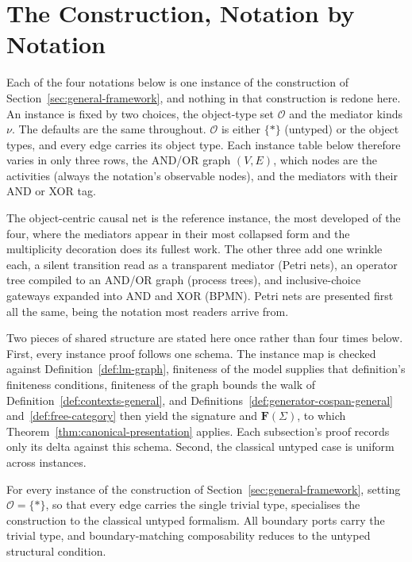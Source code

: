 \documentclass[sn-basic]{sn-jnl-arxiv}
\begin{document}




\section{The Construction, Notation by Notation}\label{sec:notation-by-notation}

Each of the four notations below is one instance of the construction of
Section~\ref{sec:general-framework}, and nothing in that construction is redone here. An
instance is fixed by two choices, the object-type set $\mathcal{O}$ and the mediator kinds
$\nu$. The defaults are the same throughout.
$\mathcal{O}$ is either $\{\ast\}$ (untyped) or the object types, and every edge carries its
object type. Each instance table below therefore varies in
only three rows, the AND/OR graph $(V,E)$, which nodes are the activities (always the
notation's observable nodes), and the mediators with their AND or XOR tag.

The object-centric causal net is the reference instance, the most developed of the four,
where the mediators appear in their most collapsed form and the multiplicity decoration
does its fullest work. The other three add one wrinkle each, a silent transition read
as a transparent mediator (Petri nets), an operator tree compiled to an AND/OR graph
(process trees), and inclusive-choice gateways expanded into AND and XOR (BPMN). Petri
nets are presented first all the same, being the notation most readers arrive from.

Two pieces of shared structure are stated here once rather than four times below. First,
every instance proof follows one schema. The instance map is checked against
Definition~\ref{def:lm-graph}, finiteness of the model supplies that definition's
finiteness conditions, finiteness of the graph bounds the walk of
Definition~\ref{def:contexts-general}, and Definitions~\ref{def:generator-cospan-general}
and~\ref{def:free-category} then yield the signature and $\mathbf{F}(\Sigma)$, to which
Theorem~\ref{thm:canonical-presentation} applies. Each subsection's proof records only its delta against this schema.
Second, the classical untyped case is uniform across instances.

\begin{corollary}\label{cor:untyped-general}
  For every instance of the construction of Section~\ref{sec:general-framework}, setting
  $\mathcal{O}=\{\ast\}$, so that every edge carries the single trivial type,
  specialises the construction to the classical untyped formalism. All boundary ports
  carry the trivial type, and boundary-matching composability reduces to the untyped structural condition.
\end{corollary}








\end{document}
